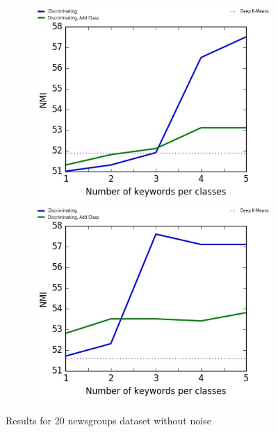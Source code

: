\begin{figure}[!h]
\begin{subfigure}[b]{\textwidth}
\begin{minipage}{0.5\linewidth}
  \includegraphics[scale=0.49]{parts/res/dat_file/nmi/20NEWS.jpg}     
\end{minipage}
  \begin{minipage}{0.5\linewidth}
\centering
   \includegraphics[scale=0.49]{parts/res/dat_file/nmi/20NEWS_simple.jpg}     
\end{minipage}
\end{subfigure}\caption{\label{fig:20news}Results for 20 newsgroups dataset without noise}
\end{figure}



